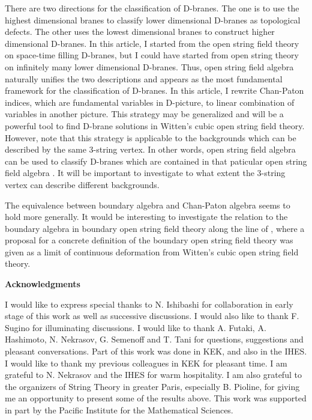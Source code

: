 \documentclass[a4paper,12pt]{article}
\providecommand{\vs}[1]{\vspace{#1 mm}}
\begin{document}
There are two directions for the
classification of D-branes.
The one is to use
the highest dimensional branes \cite{KM,KWitt}
to classify
lower dimensional D-branes
as topological defects.
The other uses the
lowest dimensional branes \cite{AST}
to construct higher dimensional D-branes.
In this article, 
I started from 
the open string field theory on
space-time filling D-branes,
but I could have started from
open string theory on
infinitely many lower dimensional
D-branes.
Thus, open string field algebra
naturally unifies the two descriptions and 
appears as
the most fundamental framework for the classification of 
D-branes.
In this article, I rewrite
Chan-Paton indices, which are
fundamental variables in D-picture, to
linear combination of variables in another picture.
This strategy may be generalized
and will be a powerful tool to find
D-brane solutions in
Witten's cubic open string field theory.
However, note that this strategy is
applicable to the backgrounds
which can be described by the
same 3-string vertex.
In other words,
open string field algebra
can be used to classify
D-branes which are
contained in that paticular
open string field algebra \cite{Aki}.
It will be important to investigate
to what extent the
3-string vertex can describe
different backgrounds.





The equivalence between
boundary algebra
and Chan-Paton algebra seems
to hold more generally.
It would be interesting to investigate
the relation to the boundary algebra 
\cite{Gera} in
boundary open
string field theory \cite{BOSFT}
along the line of \cite{Nakatsu},
where a proposal for a
concrete definition of the boundary
open string field theory 
was given
as a limit of
continuous deformation from
Witten's cubic open string field theory.





\vskip 10mm
\centerline{\bf Acknowledgments}
\vs{1.5}
\noindent
I would like to express special thanks to 
N. Ishibashi
for collaboration in early stage of this work
as well as successive discussions.
I would also like to thank
F. Sugino for illuminating discussions.
I would like to thank 
A. Futaki, A. Hashimoto, N. Nekrasov,
G. Semenoff and T. Tani for 
questions, suggestions and pleasant conversations. 
Part of this work was done in KEK, and also in the IHES.
I would like to thank my previous colleagues in KEK
for pleasant time.
I am grateful to N. Nekrasov and the IHES for warm hospitality.
I am also grateful 
to the organizers of String Theory in greater Paris,
especially B. Pioline,
for giving me an opportunity
to present some of the results above.
This work was supported in part by
the Pacific Institute for the Mathematical Sciences.
\end{document}
